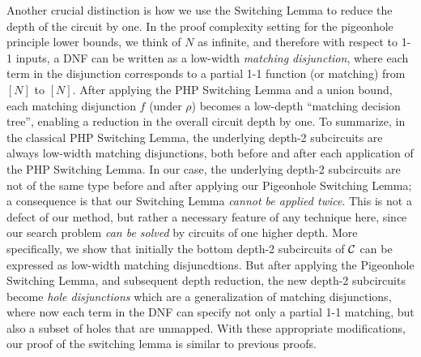 \documentclass[11pt]{article}
\begin{document}
Another crucial distinction is how we use the Switching Lemma to reduce the depth of the circuit by one. In the proof complexity setting for the pigeonhole principle lower bounds, we think of $N$ as infinite, and therefore with respect to 1-1 inputs, a DNF can be written as a low-width {\it matching disjunction}, where each term in the disjunction corresponds to a partial 1-1 function (or matching) from $[N]$ to $[N]$. After applying the PHP Switching Lemma and a union bound, each matching disjunction $f$ (under $\rho$) becomes a low-depth ``matching decision tree'', enabling a reduction in the overall circuit depth by one. To summarize, in the classical PHP Switching Lemma, the underlying depth-2 subcircuits are always low-width matching disjunctions, both before and after each application of the PHP Switching Lemma. 
In our case, the underlying depth-2 subcircuits are not of the same type before and after applying our Pigeonhole Switching Lemma; a consequence is that our Switching Lemma \emph{cannot be applied twice}. This is not a defect of our method, but rather a necessary feature of any technique here, since our search problem \emph{can be solved} by circuits of one higher depth. More specifically, we show that initially the bottom depth-2 subcircuits of ${\cal C}$ can be expressed as low-width matching disjuncdtions. But after applying the Pigeonhole Switching Lemma, and subsequent depth reduction, the new depth-2 subcircuits become \emph{hole disjunctions} which are a generalization of matching disjunctions, where now each term in the DNF can specify not only a partial 1-1 matching, but also a subset of holes that are unmapped.
With these appropriate modifications, our proof of the switching lemma is similar to previous proofs.
\end{document}
